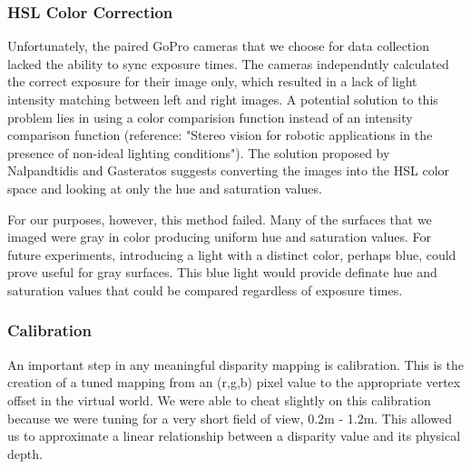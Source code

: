 \documentclass[a4paper,twoside]{article}
\begin{document}


\subsubsection{HSL Color Correction}
\label{subsec:hsl_color_correction}
Unfortunately, the paired GoPro cameras that we choose for data collection lacked the ability to sync exposure times.  
The cameras independntly calculated the correct exposure for their image only, which resulted in a lack of light intensity matching between left and right images.
A potential solution to this problem lies in using a color comparision function instead of an intensity comparison function (reference: "Stereo vision for robotic applications in the presence of non-ideal lighting conditions").
The solution proposed by Nalpandtidis and Gasteratos suggests converting the images into the HSL color space and looking at only the hue and saturation values.  
 
For our purposes, however, this method failed.  
Many of the surfaces that we imaged were gray in color producing uniform hue and saturation values.
For future experiments, introducing a light with a distinct color, perhaps blue, could prove useful for gray surfaces.  
This blue light would provide definate hue and saturation values that could be compared regardless of exposure times.


\subsubsection{Calibration}
\label{subsec:calibration}

An important step in any meaningful disparity mapping is calibration.
This is the creation of a tuned mapping from an (r,g,b) pixel value to the appropriate vertex offset in the virtual world. 
We were able to cheat slightly on this calibration because we were tuning for a very short field of view, 0.2m - 1.2m.
This allowed us to approximate a linear relationship between a disparity value and its physical depth. 
\end{document}
